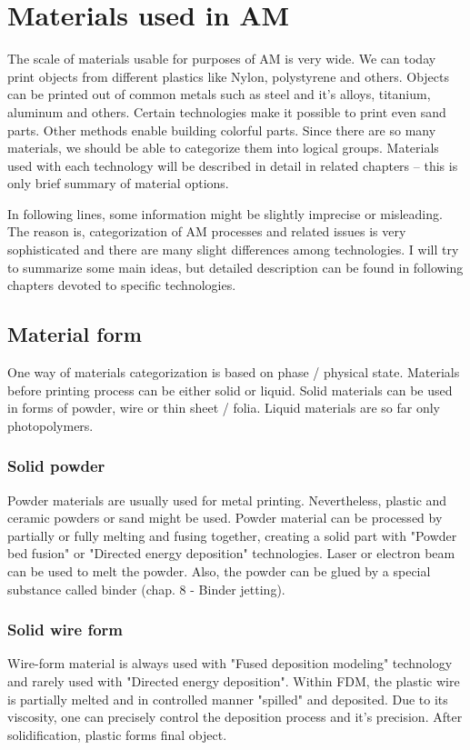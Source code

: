 \documentclass[a4paper, 11pt, reqno]{report}
\begin{document}
\chapter{Materials used in AM}
The scale of materials usable for purposes of AM is very wide. We can today print objects from different plastics like Nylon, polystyrene and others. Objects can be printed out of common metals such as steel and it's alloys, titanium, aluminum and others. Certain technologies make it possible to print even sand parts. Other methods enable building colorful parts. Since there are so many materials, we should be able to categorize them into logical groups. Materials used with each technology will be described in detail in related chapters – this is only brief summary of material options.

	In following lines, some information might be slightly imprecise or misleading. The reason is, categorization of AM processes and related issues is very sophisticated and there are many slight differences among technologies. I will try to summarize some main ideas, but detailed description can be found in following chapters devoted to specific technologies.\\

\section{Material form}
One way of materials categorization is based on phase / physical state. Materials before printing process can be either solid or liquid. Solid materials can be used in forms of powder, wire or thin sheet / folia. Liquid materials are so far only photopolymers.
\subsection{Solid powder}
Powder materials are usually used for metal printing. Nevertheless, plastic and ceramic powders or sand might be used. Powder material can be processed by partially or fully melting and fusing together, creating a solid part with "Powder bed fusion" or "Directed energy deposition" technologies. Laser or electron beam can be used to melt the powder. Also, the powder can be glued by a special substance called binder (chap. 8 - Binder jetting). 
\subsection{Solid wire form}
Wire-form material is always used with "Fused deposition modeling" technology and rarely used with "Directed energy deposition". Within FDM, the plastic wire is partially melted and in controlled manner "spilled" and deposited. Due to its viscosity, one can precisely control the deposition process and it's precision. After solidification, plastic forms final object.
\end{document}
